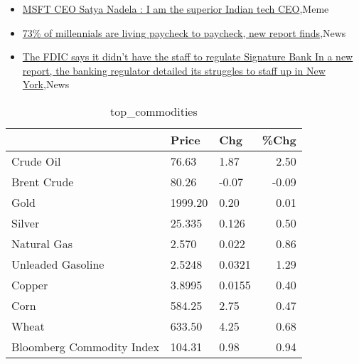 \documentclass{article}%
\begin{document}
%
\begin{itemize}%
\item%
\href{https://reddit.com/r/wallstreetbets/comments/132q8o7/msft\_ceo\_satya\_nadela\_i\_am\_the\_superior\_indian/}{MSFT CEO Satya Nadela : I am the superior Indian tech CEO},Meme%
\item%
\href{https://reddit.com/r/Economics/comments/132h6y6/73\_of\_millennials\_are\_living\_paycheck\_to\_paycheck/}{73\% of millennials are living paycheck to paycheck, new report finds},News%
\item%
\href{https://reddit.com/r/Economics/comments/132eaiw/the\_fdic\_says\_it\_didnt\_have\_the\_staff\_to\_regulate/}{The FDIC says it didn't have the staff to regulate Signature Bank  In a new report, the banking regulator detailed its struggles to staff up in New York},News%
\end{itemize}%


\begin{table}[htbp]%
\caption{top\_commodities}%
\centering%
\begin{adjustbox}{width=1\textwidth}%
\begin{tabular}{lllr}
\toprule
                          &   Price &    Chg &  \%Chg \\
\midrule
               Crude Oil  &   76.63 &   1.87 &  2.50 \\
             Brent Crude  &   80.26 &  -0.07 & -0.09 \\
                    Gold  & 1999.20 &   0.20 &  0.01 \\
                  Silver  &  25.335 &  0.126 &  0.50 \\
             Natural Gas  &   2.570 &  0.022 &  0.86 \\
       Unleaded Gasoline  &  2.5248 & 0.0321 &  1.29 \\
                  Copper  &  3.8995 & 0.0155 &  0.40 \\
                    Corn  &  584.25 &   2.75 &  0.47 \\
                   Wheat  &  633.50 &   4.25 &  0.68 \\
Bloomberg Commodity Index &  104.31 &   0.98 &  0.94 \\
\bottomrule
\end{tabular}
%
\end{adjustbox}%
\end{table}

%
\end{document}
